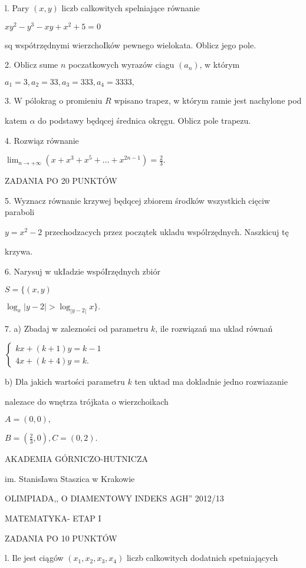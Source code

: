 \documentclass[a4paper,12pt]{article}
\begin{document}
l. Pary $(x,y)$ liczb calkowitych spelniające równanie

$xy^{2}-y^{3}-xy+x^{2}+5=0$

sq wspótrzędnymi wierzchoIków pewnego wielokata. Oblicz jego pole.

2. Oblicz sume $n$ poczatkowych wyrazów ciagu $(a_{n})$, w którym

$a_{1}=3, a_{2}=33, a_{3}=333, a_{4}=3333,$

3. $\mathrm{W}$ pólokrag o promieniu $R$ wpisano trapez, w którym ramie jest nachylone pod

katem $\alpha$ do podstawy będqcej średnica okręgu. Oblicz pole trapezu.

4. Rozwiąz równanie

$\displaystyle \lim_{n\rightarrow+\infty}(x+x^{3}+x^{5}+\ldots+x^{2n-1})=\frac{2}{3}.$

ZADANIA PO 20 PUNKTÓW

5. Wyznacz równanie krzywej będqcej zbiorem środków wszystkich cięciw paraboli

$y = x^{2}-2$ przechodzacych przez początek ukladu wspólrzędnych. Naszkicuj tę

krzywa.

6. Narysuj w ukIadzie wspóIrzędnych zbiór

$S=\{(x,y)$

$\log_{x}|y-2|>\log_{|y-2|}x\}.$

7. a) Zbadaj w zalezności od parametru $k$, ile rozwiązań ma uklad równań

$\left\{\begin{array}{l}
kx+(k+1)y=k-1\\
4x+(k+4)y=k.
\end{array}\right.$

b) Dla jakich wartości parametru $k$ ten uktad ma dokladnie jedno rozwiazanie

nalezace do wnętrza trójkata o wierzchoikach

$A=(0,0),$

$B=(\displaystyle \frac{2}{3},0), C=(0,2).$






AKADEMIA GÓRNICZO-HUTNICZA

im. StanisIawa Staszica w Krakowie

OLIMPIADA,, O DIAMENTOWY INDEKS AGH'' 2012/13

MATEMATYKA- ETAP I

ZADANIA PO 10 PUNKTÓW

l. Ile jest ciągów $(x_{1},x_{2},x_{3},x_{4})$ liczb calkowitych dodatnich spetniających
\end{document}

